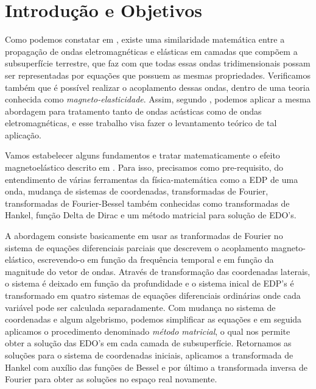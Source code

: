 \chapter{Introdu\c{c}\~ao e Objetivos}

Como podemos constatar em \cite{eringen_1963}, existe uma similaridade matem\'atica entre a propaga\c{c}\~ao de ondas eletromagn\'eticas e el\'asticas em camadas que comp\~oem a subsuperf\'icie terrestre, que faz com que todas essas ondas tridimensionais possam ser representadas por equa\c{c}\~oes que possuem as mesmas propriedades. Verificamos tamb\'em que \'e poss\'ivel realizar o acoplamento dessas ondas, dentro de uma teoria conhecida como \textit{magneto-elasticidade}. Assim, segundo \cite{Ursin-1983}, podemos aplicar a mesma abordagem para tratamento tanto de ondas ac\'usticas como de ondas eletromagn\'eticas, e esse trabalho visa fazer o levantamento te\'orico de tal aplica\c{c}\~ao. 

Vamos estabelecer alguns fundamentos e tratar matematicamente o efeito magnetoel\'astico descrito em \cite{pinho_2018}. Para isso, precisamos como pre-requisito, do entendimento de v\'arias ferramentas da f\'isica-matem\'atica como a EDP de uma onda, mudan\c{c}a de sistemas de coordenadas, transformadas de Fourier, transformadas de Fourier-Bessel tamb\'em conhecidas como transformadas de Hankel, fun\c{c}\~ao Delta de Dirac e um m\'etodo matricial para solu\c{c}\~ao de EDO's.

A abordagem consiste basicamente em usar as tranformadas de Fourier no sistema de equa\c{c}\~oes diferenciais parciais que descrevem o acoplamento magneto-el\'astico, escrevendo-o em fun\c{c}\~ao da frequ\^encia temporal e em fun\c{c}\~ao da magnitude do vetor de ondas. Atrav\'es de transforma\c{c}\~ao das coordenadas laterais, o sistema \'e deixado em fun\c{c}\~ao da profundidade e o sistema inical de EDP's \'e transformado em quatro sistemas de equa\c{c}\~oes diferenciais ordin\'arias onde cada variável pode ser calculada separadamente. Com mudan\c{c}a no sistema de coordenadas e algum algebrismo, podemos simplificar as equa\c{c}\~oes e em seguida aplicamos o procedimento denominado \textit{m\'etodo matricial}, o qual nos permite obter a solu\c{c}\~ao das EDO's em cada camada de subsuperf\'icie. Retornamos as solu\c{c}\~oes para o sistema de coordenadas iniciais, aplicamos a transformada de Hankel com aux\'ilio das fun\c{c}\~oes de Bessel e por \'ultimo a transformada inversa de Fourier para obter as solu\c{c}\~oes no espa\c{c}o real novamente.

